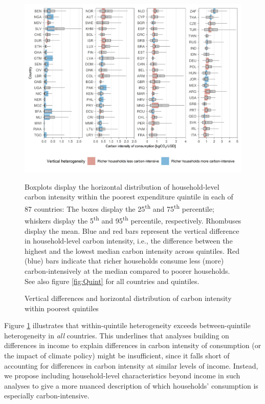 \documentclass[12pt, a4paper]{article}
\newenvironment{subcaption2}
{\strut
\vspace{-5pt}
\begin{minipage}[b]{0.9\textwidth}
  \hspace*{-\parindent}
  \footnotesize}
 {\end{minipage}}
\begin{document}
\begin{figure}[ht!]
    \centering
    \includegraphics{Figure 1/Figure_1_2017}
    \caption{Vertical differences and horizontal distribution of carbon intensity within poorest quintiles}
    \label{fig:fig_1}
    \begin{subcaption2}
    Boxplots display the horizontal distribution of household-level carbon intensity within the poorest expenditure quintile in each of 87 countries: The boxes display the 25\textsuperscript{th} and 75\textsuperscript{th} percentile; whiskers display the 5\textsuperscript{th} and 95\textsuperscript{th} percentile, respectively. Rhombuses display the mean. Blue and red bars represent the vertical difference in household-level carbon intensity, i.e., the difference between the highest and the lowest median carbon intensity across quintiles. Red (blue) bars indicate that richer households consume less (more) carbon-intensively at the median compared to poorer households. See also figure \ref{fig:Quint} for all countries and quintiles.
    \end{subcaption2}
\end{figure}

Figure \ref{fig:fig_1} illustrates that within-quintile heterogeneity exceeds between-quintile heterogeneity in \textit{all} countries. This underlines that analyses building on differences in income to explain differences in carbon intensity of consumption (or the impact of climate policy) might be insufficient, since it falls short of accounting for differences in carbon intensity at similar levels of income. Instead, we propose including household-level characteristics beyond income in such analyses to give a more nuanced description of which households' consumption is especially carbon-intensive.
\end{document}
